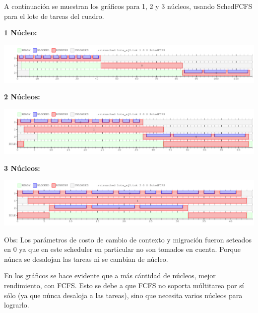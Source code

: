 A continuación se muestran los gráficos para 1, 2 y 3 núcleos, usando SchedFCFS para el lote de tareas del cuadro.\newline

\vspace{10pt}
\textbf{1 Núcleo:}
\vspace{-20pt}
\begin{center}
 \includegraphics[scale=0.5]{./ej1y2/ej2_1core.png}
\end{center}

\vspace{10pt}

\textbf{2 Núcleos:}
\vspace{-20pt}
\begin{center}
 \includegraphics[scale=0.5]{./ej1y2/ej2_2core.png}
\end{center}

\vspace{10pt}

\textbf{3 Núcleos:}
\vspace{-20pt}
\begin{center}
 \includegraphics[scale=0.5]{./ej1y2/ej2_3core.png}
\end{center}


Obs: Los parámetros de costo de cambio de contexto y migración fueron seteados en 0 ya que en este scheduler en particular
no son tomados en cuenta. Porque núnca se desalojan las tareas ni se cambian de núcleo.

En los gráficos se hace evidente que a más cántidad de núcleos, mejor rendimiento, con FCFS.
Esto se debe a que FCFS no soporta múltitarea por sí sólo (ya que núnca desaloja a las tareas), sino que necesita varios núcleos para lograrlo.\newline

